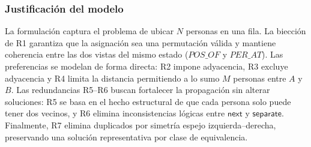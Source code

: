 \subsubsection*{Justificación del modelo}
La formulación captura  el problema de ubicar \(N\) personas en una fila. La biección de R1 garantiza que la asignación sea una permutación válida y mantiene coherencia entre las dos vistas del mismo estado (\(POS\_OF\) y \(PER\_AT\)). Las preferencias se modelan de forma directa: R2 impone adyacencia, R3 excluye adyacencia y R4 limita la distancia permitiendo a lo sumo \(M\) personas entre \(A\) y \(B\). Las redundancias R5–R6 buscan fortalecer la propagación sin alterar soluciones: R5 se basa en el hecho estructural de que cada persona solo puede tener dos vecinos, y R6 elimina inconsistencias lógicas entre \(\textsf{next}\) y \(\textsf{separate}\). Finalmente, R7 elimina duplicados por simetría espejo izquierda–derecha, preservando una solución representativa por clase de equivalencia.